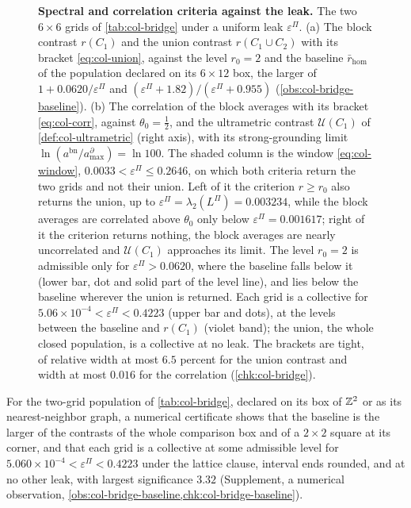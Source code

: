 \begin{figure}[!t]
  \centering
  
  \caption{\textbf{Spectral and correlation criteria against the leak.} The two $6\times6$ grids of \cref{tab:col-bridge} under a uniform leak $\varepsilon^\Pi$. (a) The block contrast $r(C_1)$ and the union contrast $r(C_1\cup C_2)$ with its bracket \eqref{eq:col-union}, against the level $r_0=2$ and the baseline $\bar r_{\mathrm{hom}}$ of the population declared on its $6\times12$ box, the larger of $1+0.0620/\varepsilon^\Pi$ and $(\varepsilon^\Pi+1.82)/(\varepsilon^\Pi+0.955)$ (\cref{obs:col-bridge-baseline}). (b) The correlation of the block averages with its bracket \eqref{eq:col-corr}, against $\theta_0=\frac12$, and the ultrametric contrast $\mathcal U(C_1)$ of \cref{def:col-ultrametric} (right axis), with its strong-grounding limit $\ln(a^{\mathrm{bn}}/a^\partial_{\max})=\ln100$. The shaded column is the window \eqref{eq:col-window}, $0.0033<\varepsilon^\Pi\le0.2646$, on which both criteria return the two grids and not their union. Left of it the criterion $r\ge r_0$ also returns the union, up to $\varepsilon^\Pi=\lambda_2(L^\Pi)=0.003234$, while the block averages are correlated above $\theta_0$ only below $\varepsilon^\Pi=0.001617$; right of it the criterion returns nothing, the block averages are nearly uncorrelated and $\mathcal U(C_1)$ approaches its limit. The level $r_0=2$ is admissible only for $\varepsilon^\Pi>0.0620$, where the baseline falls below it (lower bar, dot and solid part of the level line), and lies below the baseline wherever the union is returned. Each grid is a collective for $5.06\times10^{-4}<\varepsilon^\Pi<0.4223$ (upper bar and dots), at the levels between the baseline and $r(C_1)$ (violet band); the union, the whole closed population, is a collective at no leak. The brackets are tight, of relative width at most $6.5$ percent for the union contrast and width at most $0.016$ for the correlation (\cref{chk:col-bridge}).}
  \label{fig:col-bridge}
\end{figure}

For the two-grid population of \cref{tab:col-bridge}, declared on its box of $\mathbb{Z}^2$ or as its nearest-neighbor graph, a numerical certificate shows that the baseline is the larger of the contrasts of the whole comparison box and of a $2\times2$ square at its corner, and that each grid is a collective at some admissible level for $5.060\times10^{-4}<\varepsilon^\Pi<0.4223$ under the lattice clause, interval ends rounded, and at no other leak, with largest significance $3.32$ (Supplement, a numerical observation, \cref{obs:col-bridge-baseline,chk:col-bridge-baseline}).

